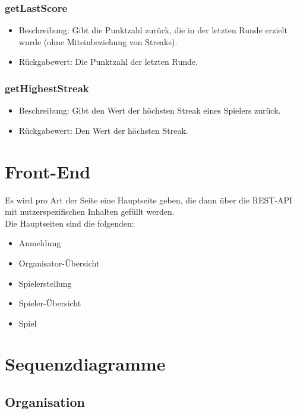 \documentclass[a4paper]{scrreprt}
\begin{document}
	\subsection{getLastScore}
	\begin{itemize}
		\item Beschreibung: Gibt die Punktzahl zurück, die in der letzten Runde erzielt wurde (ohne Miteinbeziehung von Streaks).
		\item Rückgabewert: Die Punktzahl der letzten Runde.
	\end{itemize}
	\subsection{getHighestStreak}
	\begin{itemize}
		\item Beschreibung: Gibt den Wert der höchsten Streak eines Spielers zurück.
		\item Rückgabewert: Den Wert der höchsten Streak.
	\end{itemize}




	\chapter{Front-End}
	Es wird pro Art der Seite eine Hauptseite geben, die dann über die REST-API mit nutzerspezifischen Inhalten gefüllt werden. \\
	Die Hauptseiten sind die folgenden: \\
	\begin{itemize}
		\item   Anmeldung
		\item   Organisator-Übersicht
		\item   Spielerstellung
		\item   Spieler-Übersicht
		\item   Spiel
	\end{itemize}


	\chapter{Sequenzdiagramme}

	\section{Organisation}
\end{document}
